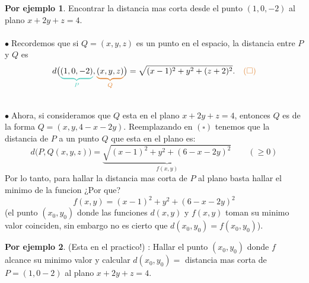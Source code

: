 \documentclass{article}
\theoremstyle{definition}
\newtheorem*{ej}{Por ejemplo}
\theoremstyle{remark}
\newcommand\bl{$\bullet\;$}
\begin{document}
\begin{ej}
  Encontrar la distancia mas corta desde el punto $(1,0,-2)$ al plano $x+2y+z=4$. \\\\ 
\bl Recordemos que si $Q=(x,y,z)$ es un punto en el espacio, la distancia entre $P$ y $Q$ es \[
  d\big(\textcolor{verdep2}{\underbrace{\textcolor{black}{(1,0,-2)}}_{P}},\textcolor{rojop2}{\underbrace{\textcolor{black}{(x,y,z)}}_{Q}}\big)=\sqrt{(x-1)^2+y^2+(z+2)^2}. \quad \textcolor{rojop2}{(\square)}
\]\;
  \begin{figure}[h]
\centering
\def\svgwidth{0.55\textwidth}
\makebox[\textwidth]{
}
\end{figure} \\
\bl Ahora, si consideramos que $Q$ esta en el plano $x+2y+z=4$, entonces $Q$ es de la forma $Q=(x,y,4-x-2y)$. Reemplazando en \textcolor{rojop2}{$(\square)$} tenemos que la distancia de $P$ a un punto $Q$ que esta en el plano es: \[
  d\big(P,Q(x,y,z)\big)=\underbrace{\sqrt{(x-1)^2+y^2+(6-x-2y)^2}}_{f(x,y)} \quad \quad (\geq 0)
\]
Por lo tanto, para hallar la distancia mas corta de $P$ al plano basta hallar el minimo de la funcion \textcolor{rojop2}{¿Por que?} \[
f(x,y)=(x-1)^2+y^2+(6-x-2y)^2
\]\textcolor{rojop2}{\big(el punto $(x_0,y_0)$ donde las funciones $d(x,y)$ y $f(x,y)$ toman su minimo valor coinciden, sin embargo no es cierto que $d(x_0,y_0)=f(x_0,y_0)$\big).}
\end{ej}
\begin{ej}
  (Esta en el practico!) : Hallar el punto $(x_0,y_0)$ donde $f$ alcance su minimo valor y calcular $d(x_0,y_0)=$ distancia mas corta de $P=(1,0-2)$ al plano $x+2y+z=4$.
\end{ej}
\end{document}
